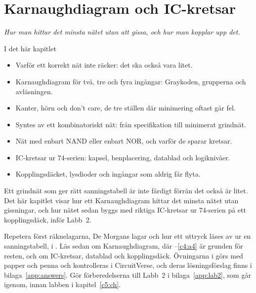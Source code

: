 
\chapter{Karnaughdiagram och IC-kretsar}
\label{c4:ch}

{\large\itshape Hur man hittar det minsta nätet utan att gissa, och hur man kopplar upp det.\par}

\begin{chapterbox}{I det här kapitlet}
\begin{itemize}
  \item Varför ett korrekt nät inte räcker: det ska också vara litet.
  \item Karnaughdiagram för två, tre och fyra ingångar: Graykoden, grupperna och avläsningen.
  \item Kanter, hörn och don't care, de tre ställen där minimering oftast går fel.
  \item Syntes av ett kombinatoriskt nät: från specifikation till minimerat grindnät.
  \item Nät med enbart NAND eller enbart NOR, och varför de sparar kretsar.
  \item IC-kretsar ur 74-serien: kapsel, benplacering, datablad och logiknivåer.
  \item Kopplingsdäcket, lysdioder och ingångar som aldrig får flyta.
\end{itemize}
\end{chapterbox}

Ett grindnät som ger rätt sanningstabell är inte färdigt förrän det också är litet. Det här
kapitlet visar hur ett Karnaughdiagram hittar det minsta nätet utan gissningar, och hur nätet
sedan byggs med riktiga IC-kretsar ur 74-serien på ett kopplingsdäck, inför Labb~2.

Repetera först räknelagarna, De Morgans lagar och hur ett uttryck läses av ur en sanningstabell, i
. Läs sedan  om Karnaughdiagram, där --\ref{c4:a4}
är grunden för resten, och  om IC-kretsar, datablad och kopplingsdäck. Övningarna
i  görs med papper och penna och kontrolleras i CircuitVerse, och deras
lösningsförslag finns i bilaga~\ref{app:answers}. Gör förberedelserna till Labb~2 i
bilaga~\ref{app:lab2}, som  går igenom, innan labben i kapitel~\ref{c5:ch}.





